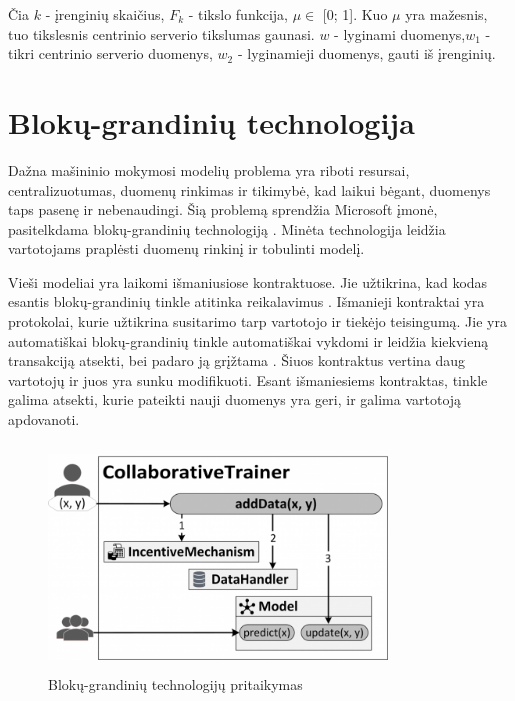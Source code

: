 \documentclass{VUMIFInfBakalaurinis}
\begin{document}
\par Čia $k$ - įrenginių skaičius, $F_{k}$ - tikslo funkcija, $\mu \in$ [0; 1]. Kuo $\mu$ yra mažesnis, tuo tikslesnis centrinio serverio tikslumas gaunasi. $w$ - lyginami duomenys,$w_{1}$ - tikri centrinio serverio duomenys, $w_{2}$ - lyginamieji duomenys, gauti iš įrenginių.

\section{Blokų-grandinių technologija}
\par Dažna mašininio mokymosi modelių problema yra riboti resursai, centralizuotumas, duomenų rinkimas ir tikimybė, kad laikui bėgant, duomenys taps pasenę ir nebenaudingi. Šią problemą sprendžia Microsoft įmonė, pasitelkdama blokų-grandinių technologiją \cite{25}.  Minėta technologija leidžia vartotojams praplėsti duomenų rinkinį ir tobulinti modelį.
\par Vieši modeliai yra laikomi išmaniusiose kontraktuose. Jie užtikrina, kad kodas esantis blokų-grandinių tinkle atitinka reikalavimus \cite{25}.  Išmanieji kontraktai yra protokolai, kurie užtikrina susitarimo tarp vartotojo ir tiekėjo teisingumą. Jie yra automatiškai blokų-grandinių tinkle automatiškai vykdomi ir leidžia kiekvieną transakciją atsekti, bei padaro ją grįžtama \cite{26}. Šiuos kontraktus vertina daug vartotojų ir juos yra sunku modifikuoti. Esant išmaniesiems kontraktas, tinkle galima atsekti, kurie pateikti nauji duomenys yra geri, ir galima vartotoją apdovanoti.

\begin{figure}[h]
  \centering
  \includegraphics[width=9cm,height=6cm,keepaspectratio]{img/blockchain_1.png}
  \caption{Blokų-grandinių technologijų pritaikymas \cite{25}}
  \label{fig:Blokų-grandinių technologijų pritaikymas}
\end{figure}
\end{document}
